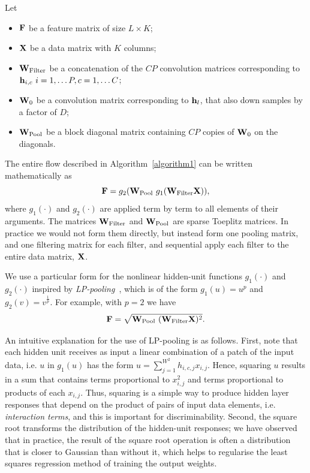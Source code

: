 \documentclass[conference]{IEEEtran}
\begin{document}
Let 
\begin{itemize}
\item ${\bf F}$ be a feature matrix of size $L\times K$;
\item ${\bf X}$ be a data matrix with $K$ columns;
\item ${\bf W}_{\rm Filter}$ be a concatenation of the $CP$ convolution matrices corresponding to ${\bf h}_{i,c}~i=1,\dots P,c=1,\dots C$;
\item ${\bf W}_0$ be a convolution matrix corresponding to ${\bf h}_l$, that also down samples by a factor of $D$;
\item ${\bf W}_{\rm Pool}$ be a block diagonal matrix containing $CP$ copies of ${\bf W}_0$ on the diagonals.
\end{itemize}
The entire flow described in Algorithm~\ref{algorithm1} can  be written mathematically as
\begin{equation}
{\bf F} = g_2({\bf W}_{\rm Pool}~g_1({\bf W}_{\rm Filter}{\bf X})),
\end{equation}
where  $g_1(\cdot)$ and $g_2(\cdot)$ are applied term by term to all elements of their arguments. The matrices  ${\bf W}_{\rm Filter}$ and ${\bf W}_{\rm Pool}$ are sparse Toeplitz matrices. In practice we would not form them directly, but instead form one pooling matrix, and one filtering matrix for each filter, and sequential apply each filter to the entire data matrix, ${\bf X}$.

We use a particular  form for the nonlinear hidden-unit functions $g_1(\cdot)$ and $g_2(\cdot)$  inspired by {\em LP-pooling}~\cite{Sermanet.12}, which is of the form $g_1(u) = u^p$ and
$g_2(v) = v^{\frac{1}{p}}$. For example, with $p=2$ we have
\begin{equation}
{\bf F} = \sqrt{{\bf W}_{\rm Pool}~({\bf W}_{\rm Filter}{\bf X})^2}.
\end{equation}

An intuitive explanation for the use of LP-pooling is as follows. First, note that each hidden unit receives as input a linear combination of a patch of the input data, i.e. $u$ in $g_1(u)$ has the form $u=\sum_{j=1}^{W^2}h_{i,c,j}x_{i,j}$. Hence, squaring $u$ results in a sum that contains  terms proportional to $x_{i,j}^2$ and terms proportional to products of each $x_{i,j}$. Thus, squaring is a simple way to produce hidden layer responses that depend on the product of pairs of input data elements, i.e. {\em interaction terms}, and this is important for discriminability.  Second, the square root transforms the distribution of the hidden-unit responses; we have observed that in practice, the result of the square root operation is often a distribution that is closer to Gaussian than without it, which helps to regularise the least squares regression method of training the output weights.
\end{document}
